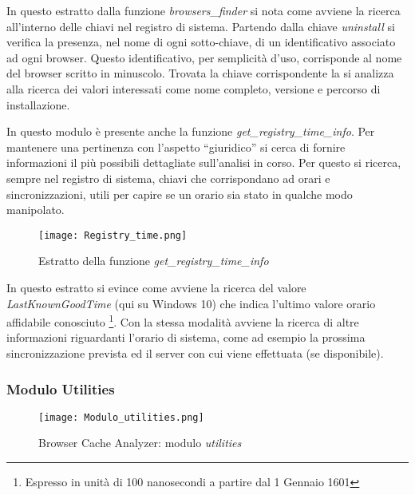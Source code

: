 In questo estratto dalla funzione \textit{browsers\_finder} si nota come avviene la ricerca all'interno delle chiavi nel registro di sistema. Partendo dalla chiave \textit{uninstall} si verifica la presenza, nel nome di ogni sotto-chiave, di un identificativo associato ad ogni browser. Questo identificativo, per semplicità d'uso, corrisponde al nome del browser scritto in minuscolo.
Trovata la chiave corrispondente la si analizza alla ricerca dei valori interessati come nome completo, versione e percorso di installazione. 

In questo modulo è presente anche la funzione \textit{get\_registry\_time\_info}. Per mantenere una pertinenza con l'aspetto ``giuridico'' si cerca di fornire informazioni il più possibili dettagliate sull'analisi in corso. Per questo si ricerca, sempre nel registro di sistema, chiavi che corrispondano ad orari e sincronizzazioni, utili per capire se un orario sia stato in qualche modo manipolato.

\begin{figure}[htpb]
	\begin{center}
		\texttt{[image: Registry\_time.png]}
	\end{center}
	\caption[Estratto della funzione \textit{get\_registry\_time\_info}]{Estratto della funzione \textit{get\_registry\_time\_info}}
\end{figure}

In questo estratto si evince come avviene la ricerca del valore \textit{LastKnownGoodTime} (qui su Windows 10) che indica l'ultimo valore orario affidabile conosciuto \footnote{Espresso in unità di 100 nanosecondi a partire dal 1 Gennaio 1601}. Con la stessa modalità avviene la ricerca di altre informazioni riguardanti l'orario di sistema, come ad esempio la prossima sincronizzazione prevista ed il server con cui viene effettuata (se disponibile).


\subsubsection{Modulo Utilities}
\begin{figure}[htpb]
	\begin{center}
		\texttt{[image: Modulo\_utilities.png]}
	\end{center}
	\caption[Browser Cache Analyzer: modulo \textit{utilities}]{Browser Cache Analyzer: modulo \textit{utilities}}
\end{figure}

